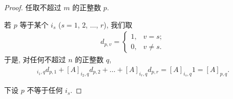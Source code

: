 \documentclass[../libro.tex]{subfiles}
\begin{document}
\begin{proof}
    任取不超过 \(m\) 的正整数 \(p\).

    若 \(p\) 等于某个 \(i_s\)
    (\(s = 1\), \(2\), \(\dots\), \(r\)),
    我们取
    \begin{align*}
        d_{p,v} =
        \begin{cases}
            1, & v = s;    \\
            0, & v \neq s.
        \end{cases}
    \end{align*}
    于是, 对任何不超过 \(n\) 的正整数 \(q\),
    \begin{align*}
        [A]_{i_1,q} d_{p,1}
        + [A]_{i_2,q} d_{p,2}
        + \dots
        + [A]_{i_r,q} d_{p,r}
        = [A]_{i_s,q} 1
        = [A]_{p,q}.
    \end{align*}

    下设 \(p\) 不等于任何 \(i_s\).


\end{proof}
\end{document}
